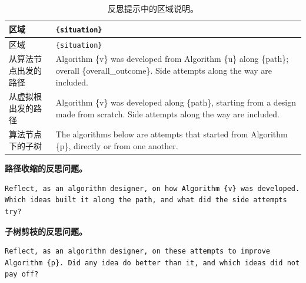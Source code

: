 \documentclass{article}
\begin{document}
\begin{longtable}[]{@{}
  >{\raggedright\arraybackslash}p{}
  >{\raggedright\arraybackslash}p{}@{}}
\caption{反思提示中的区域说明。}\tabularnewline
\toprule\noalign{}
\begin{minipage}[b]{\linewidth}\raggedright
区域
\end{minipage} & \begin{minipage}[b]{\linewidth}\raggedright
\texttt{\{situation\}}
\end{minipage} \\
\midrule\noalign{}
\endfirsthead
\toprule\noalign{}
\begin{minipage}[b]{\linewidth}\raggedright
区域
\end{minipage} & \begin{minipage}[b]{\linewidth}\raggedright
\texttt{\{situation\}}
\end{minipage} \\
\midrule\noalign{}
\endhead
\bottomrule\noalign{}
\endlastfoot
从算法节点出发的路径 & Algorithm \{v\} was developed from Algorithm \{u\} along \{path\}; overall \{overall\_outcome\}. Side attempts along the way are included. \\
从虚拟根出发的路径 & Algorithm \{v\} was developed along \{path\}, starting from a design made from scratch. Side attempts along the way are included. \\
算法节点下的子树 & The algorithms below are attempts that started from Algorithm \{p\}, directly or from one another. \\
\end{longtable}

\noindent\begin{minipage}{\linewidth}
\textbf{路径收缩的反思问题。}

\begin{verbatim}
Reflect, as an algorithm designer, on how Algorithm {v} was developed. Which ideas built it along the path, and what did the side attempts try?
\end{verbatim}
\end{minipage}\par

\noindent\begin{minipage}{\linewidth}
\textbf{子树剪枝的反思问题。}

\begin{verbatim}
Reflect, as an algorithm designer, on these attempts to improve Algorithm {p}. Did any idea do better than it, and which ideas did not pay off?
\end{verbatim}
\end{minipage}\par
\end{document}

